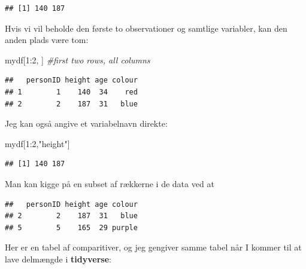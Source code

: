 \documentclass[
]{book}
\newenvironment{Shaded}{\begin{snugshade}}{\end{snugshade}}
\newcommand{\CommentTok}[1]{\textcolor[rgb]{0.56,0.35,0.01}{\textit{#1}}}
\newcommand{\DecValTok}[1]{\textcolor[rgb]{0.00,0.00,0.81}{#1}}
\newcommand{\NormalTok}[1]{#1}
\newcommand{\SpecialCharTok}[1]{\textcolor[rgb]{0.00,0.00,0.00}{#1}}
\newcommand{\StringTok}[1]{\textcolor[rgb]{0.31,0.60,0.02}{#1}}
\begin{document}
\begin{verbatim}
## [1] 140 187
\end{verbatim}

Hvis vi vil beholde den første to observationer og samtlige variabler, kan den anden plads være tom:

\begin{Shaded}
\begin{Highlighting}[]
\NormalTok{mydf[}\DecValTok{1}\SpecialCharTok{:}\DecValTok{2}\NormalTok{, ]  }\CommentTok{\#first two rows, all columns}
\end{Highlighting}
\end{Shaded}

\begin{verbatim}
##   personID height age colour
## 1        1    140  34    red
## 2        2    187  31   blue
\end{verbatim}

Jeg kan også angive et variabelnavn direkte:

\begin{Shaded}
\begin{Highlighting}[]
\NormalTok{mydf[}\DecValTok{1}\SpecialCharTok{:}\DecValTok{2}\NormalTok{,}\StringTok{"height"}\NormalTok{]}
\end{Highlighting}
\end{Shaded}

\begin{verbatim}
## [1] 140 187
\end{verbatim}

Man kan kigge på en subset af rækkerne i de data ved at

\begin{Shaded}
\end{Shaded}

\begin{verbatim}
##   personID height age colour
## 2        2    187  31   blue
## 5        5    165  29 purple
\end{verbatim}

Her er en tabel af comparitiver, og jeg gengiver samme tabel når I kommer til at lave delmængde i \textbf{tidyverse}:
\end{document}
